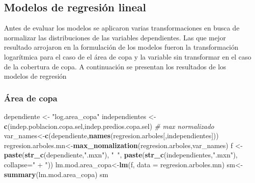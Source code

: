 \documentclass[12pt,]{book}
\newenvironment{Shaded}{\begin{snugshade}}{\end{snugshade}}
\newcommand{\KeywordTok}[1]{\textcolor[rgb]{0.13,0.29,0.53}{\textbf{#1}}}
\newcommand{\DataTypeTok}[1]{\textcolor[rgb]{0.13,0.29,0.53}{#1}}
\newcommand{\StringTok}[1]{\textcolor[rgb]{0.31,0.60,0.02}{#1}}
\newcommand{\CommentTok}[1]{\textcolor[rgb]{0.56,0.35,0.01}{\textit{#1}}}
\newcommand{\NormalTok}[1]{#1}
\begin{document}
\subsection{Modelos de regresión
lineal}\label{modelos-de-regresion-lineal}

Antes de evaluar los modelos se aplicaron varias transformaciones en
busca de normalizar las distribuciones de las variables dependientes.
Las que mejor resultado arrojaron en la formulación de los modelos
fueron la transformación logarítmica para el caso de el área de copa y
la variable sin transformar en el caso de la cobertura de copa. A
continuación se presentan los resultados de los modelos de regresión

\subsubsection{Área de copa}\label{area-de-copa}

\begin{Shaded}
\begin{Highlighting}[]
\NormalTok{dependiente <-}\StringTok{ "log.area_copa"}
\NormalTok{independientes  <-}\StringTok{ }\KeywordTok{c}\NormalTok{(indep.poblacion.copa.sel,indep.predios.copa.sel)}
\CommentTok{# max normalizado }
\NormalTok{var_names<-}\KeywordTok{c}\NormalTok{(dependiente,}\KeywordTok{names}\NormalTok{(regresion.arboles[,independientes]))}
\NormalTok{regresion.arboles.mn<-}\KeywordTok{max_nomalization}\NormalTok{(regresion.arboles,var_names)}
\NormalTok{f <-}\StringTok{ }\KeywordTok{paste}\NormalTok{(}\KeywordTok{str_c}\NormalTok{(dependiente,}\StringTok{".mxn"}\NormalTok{),}
           \StringTok{"~"}\NormalTok{, }\KeywordTok{paste}\NormalTok{(}\KeywordTok{str_c}\NormalTok{(independientes,}\StringTok{".mxn"}\NormalTok{), }
                      \DataTypeTok{collapse=}\StringTok{" + "}\NormalTok{))}
\NormalTok{lm.mod.area_copa<-}\KeywordTok{lm}\NormalTok{(f, }
                     \DataTypeTok{data =}\NormalTok{ regresion.arboles.mn)}
\NormalTok{sm<-}\KeywordTok{summary}\NormalTok{(lm.mod.area_copa)}
\NormalTok{sm}
\end{Highlighting}
\end{Shaded}
\end{document}
